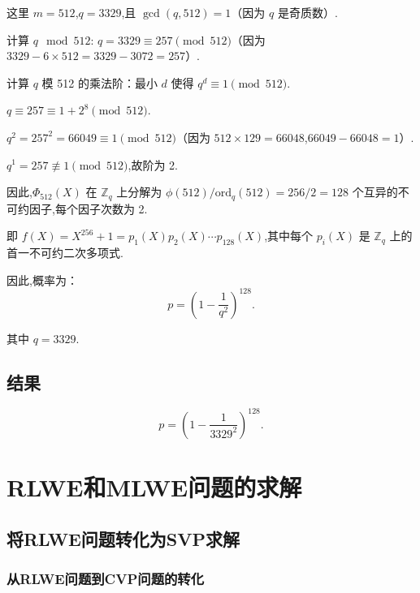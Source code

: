 \documentclass[12pt,a4paper]{article}
\numberwithin{equation}{section}
\begin{document}
这里 $m = 512$,$q = 3329$,且 $\gcd(q, 512) = 1$（因为 $q$ 是奇质数）.

计算 $q \mod 512$: $q = 3329 \equiv 257 \pmod{512}$（因为 $3329 - 6 \times 512 = 3329 - 3072 = 257$）.

计算 $q$ 模 512 的乘法阶：最小 $d$ 使得 $q^d \equiv 1 \pmod{512}$.

$q \equiv 257 \equiv 1 + 2^8 \pmod{512}$.

$q^2 = 257^2 = 66049 \equiv 1 \pmod{512}$（因为 $512 \times 129 = 66048$,$66049 - 66048 = 1$）.

$q^1 = 257 \not\equiv 1 \pmod{512}$,故阶为 2.

因此,$\Phi_{512}(X)$ 在 $\mathbb{Z}_q$ 上分解为 $\phi(512) / \text{ord}_q(512) = 256 / 2 = 128$ 个互异的不可约因子,每个因子次数为 2.

即 $f(X) = X^{256} + 1 = p_1(X) p_2(X) \cdots p_{128}(X)$,其中每个 $p_i(X)$ 是 $\mathbb{Z}_q$ 上的首一不可约二次多项式.

因此,概率为：
\begin{equation}
	p = \left(1 - \frac{1}{q^2}\right)^{128}.
\end{equation}


其中 $q = 3329$.



\subsection{结果}

\begin{equation}
	p = \left(1 - \frac{1}{3329^2}\right)^{128}.
\end{equation}



\section{RLWE和MLWE问题的求解}

\subsection{将RLWE问题转化为SVP求解}

\subsubsection{从RLWE问题到CVP问题的转化}
\end{document}
